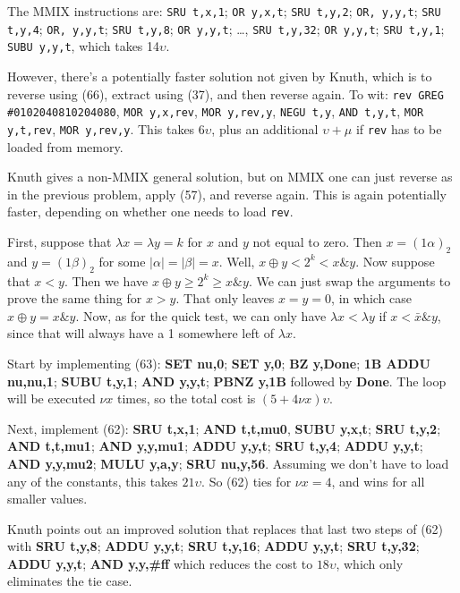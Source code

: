 \vskip 0.08in  The MMIX instructions are:
{\tt SRU t,x,1}; {\tt OR y,x,t}; {\tt SRU t,y,2}; {\tt OR, y,y,t}; {\tt SRU t,y,4};
{\tt OR, y,y,t}; {\tt SRU t,y,8}; {\tt OR y,y,t}; \dots, {\tt SRU t,y,32};
{\tt OR y,y,t}; {\tt SRU t,y,1}; {\tt SUBU y,y,t}, which takes 14$\upsilon$.

However, there's a potentially faster solution not given by Knuth, which
is to reverse using (66), extract using (37), and then reverse again.
To wit: {\tt rev GREG \#0102040810204080}, {\tt MOR y,x,rev},
{\tt MOR y,rev,y}, {\tt NEGU t,y}, {\tt AND t,y,t}, {\tt MOR y,t,rev},
{\tt MOR y,rev,y}.  This takes 6$\upsilon$, plus an additional
$\upsilon + \mu$ if {\tt rev} has to be loaded from memory.

\vskip 0.08in  Knuth gives a non-MMIX
general solution, but on MMIX one can just reverse as in the
previous problem, apply (57), and reverse again.  This is again
potentially faster, depending on whether one needs to load {\tt rev}.

\vskip 0.08in  First, suppose that 
$\lambda x = \lambda y = k$ for $x$ and $y$ not equal to zero.
Then $x = \left(1 \alpha \right)_2$
and $y = \left(1 \beta \right)_2$ for some $| \alpha | = | \beta | = x$.
Well, $x \oplus y < 2^k < x \& y$.  Now suppose that $x < y$.
Then we have $x \oplus y \geq 2^k \ge x \& y$.  We can just swap
the arguments to prove the same thing for $x > y$.
That only leaves $x = y = 0$, in which case $x \oplus y = x \& y$.
Now, as for the quick test, we can only have $\lambda x < \lambda y$
if $x < \bar{x} \& y$, since that will always have a 1 somewhere
left of $\lambda x$.

\vskip 0.08in  Start by implementing (63): 
{\bf SET  nu,0}; {\bf SET  y,0}; {\bf BZ  y,Done}; {\bf 1B ADDU  nu,nu,1};
{\bf SUBU  t,y,1}; {\bf AND  y,y,t}; {\bf PBNZ  y,1B} followed by {\bf Done}.
The loop will be executed $\nu   x$ times, so the total cost is 
$\left(5 + 4 \nu   x \right) \upsilon$.

Next, implement (62): {\bf SRU  t,x,1}; {\bf AND  t,t,mu0}, {\bf SUBU  y,x,t};
{\bf SRU  t,y,2}; {\bf AND  t,t,mu1}; {\bf AND  y,y,mu1}; {\bf ADDU  y,y,t};
{\bf SRU  t,y,4}; {\bf ADDU  y,y,t}; {\bf AND  y,y,mu2}; {\bf MULU  y,a,y};
{\bf SRU  nu,y,56}.  Assuming we don't have to load any of the constants,
this takes $21\upsilon$.  So (62) ties for $\nu   x = 4$, and wins for all
smaller values.

Knuth points out an improved solution that replaces that last two steps of (62)
with {\bf SRU  t,y,8}; {\bf ADDU  y,y,t}; {\bf SRU  t,y,16}; {\bf ADDU  y,y,t};
{\bf SRU  t,y,32}; {\bf ADDU  y,y,t}; {\bf AND y,y,\#ff} which reduces the cost
to $18\upsilon$, which only eliminates the tie case.

